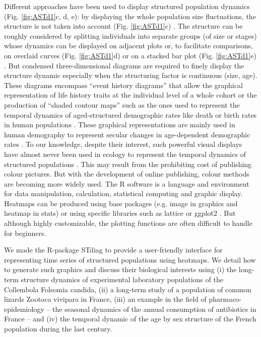 Different approaches have been used to display structured population dynamics
(Fig. \ref{fig:ASTd1}c, d, e): by displaying the whole population size
fluctuations, the structure is not taken into account (Fig.  \ref{fig:ASTd1}c)
\autocites{schrautzer2011a}. The structure can be roughly considered by
splitting individuals into separate groups (of size or stages) whose dynamics
can be displayed on adjacent plots \autocites{plaistow2009a} or, to facilitate
comparisons, on overlaid curves (Fig.
 \ref{fig:ASTd1}d) or on a stacked bar plot (Fig.  \ref{fig:ASTd1}e)
 \autocites{madsen2000a}. But condensed three-dimensional diagrams are required
 to finely display the structure dynamic especially when the structuring factor
 is continuous (size, age). These diagrams
encompass “event history diagrams” that allow the graphical representation of
life history traits at the individual level of a whole cohort
\autocites{carey1998a,carey2008a} or the production of “shaded contour maps”
such as the ones used to represent the temporal dynamics of aged-structured
demographic rates like death or birth rates in human populations
\autocites{vaupel1997a,vaupel1998a}. These graphical representations are mainly
used in human demography to represent secular changes in age-dependent
demographic rates
\autocites{vaupel1987a,vaupel1997a,vaupel1998a,andreev2000a,erlangsen2003a}. To
our knowledge, despite their interest, such powerful visual displays have almost
never been used in ecology to represent the temporal dynamics of structured
populations \autocites{faerovig2002a}. This may result
from the prohibiting cost of publishing colour pictures. But with the development of
online publishing, colour methods are becoming more widely used. The R software
\autocites{team2012a} is a language and
environment for data manipulation, calculation, statistical computing and graphic display. Heatmaps
can be produced using base packages (e.g. image in graphics and heatmap in
stats) or using specific libraries such as lattice
\autocites{sarkar2008a} or ggplot2 \autocites{wickham2009a}. But although
highly customizable, the plotting functions are often difficult to handle for beginners.

We made the R-package STdiag to provide a user-friendly interface for
representing time series of structured populations using heatmaps. We detail how
to generate such graphics and discuss their biological interests using (i) the
long-term structure dynamics of experimental laboratory populations of the
Collembola Folsomia candida, (ii) a long-term study of a
population of common lizards Zootoca vivipara in France, (iii) an example
in the field of pharmaco-epidemiology -- the seasonal dynamics of the annual
consumption of antibiotics in France -- and (iv) the temporal dynamic
of the age by sex structure of the French population during the last century.

